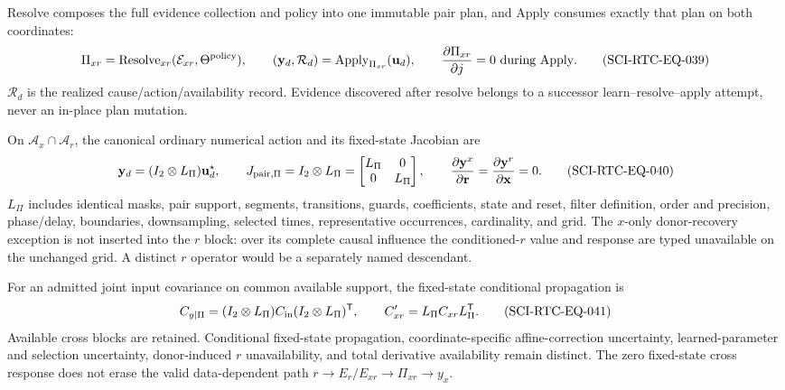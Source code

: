 Resolve composes the full evidence collection and policy into one immutable
pair plan, and Apply consumes exactly that plan on both coordinates:
\begin{equation}
 \Pi_{xr}=\operatorname{Resolve}_{xr}(\mathcal E_{xr},
               \Theta^{\rm policy}),\qquad
 (\mathbf y_d,\mathcal R_d)=\operatorname{Apply}_{\Pi_{xr}}
               (\mathbf u_d),\qquad
 \frac{\partial\Pi_{xr}}{\partial j}=0\ \text{during Apply}.
 \tag{SCI-RTC-EQ-039}\label{eq:pair-resolve-apply}
\end{equation}
$\mathcal R_d$ is the realized cause/action/availability record.  Evidence
discovered after resolve belongs to a successor learn--resolve--apply attempt,
never an in-place plan mutation.

On $\mathcal A_x\cap\mathcal A_r$, the canonical ordinary numerical action
and its fixed-state Jacobian are
\begin{equation}
 \mathbf y_d=(I_2\otimes L_\Pi)\mathbf u_d^\star,
 \qquad
 J_{{\rm pair},\Pi}=I_2\otimes L_\Pi
 =\begin{bmatrix}L_\Pi&0\\0&L_\Pi\end{bmatrix},
 \qquad
 \frac{\partial\mathbf y^x}{\partial\mathbf r}
 =\frac{\partial\mathbf y^r}{\partial\mathbf x}=0.
 \tag{SCI-RTC-EQ-040}\label{eq:canonical-pair-operator}
\end{equation}
$L_\Pi$ includes identical masks, pair support, segments, transitions, guards,
coefficients, state and reset, filter definition, order and precision,
phase/delay, boundaries, downsampling, selected times, representative
occurrences, cardinality, and grid.  The $x$-only donor-recovery exception is
not inserted into the $r$ block: over its complete causal influence the
conditioned-$r$ value and response are typed unavailable on the unchanged
grid.  A distinct $r$ operator would be a separately named descendant.

For an admitted joint input covariance on common available support, the
fixed-state conditional propagation is
\begin{equation}
 C_{y\mid\Pi}=(I_2\otimes L_\Pi)C_{\rm in}
                    (I_2\otimes L_\Pi)^{\mathsf T},
 \qquad
 C'_{xr}=L_\Pi C_{xr}L_\Pi^{\mathsf T}.
 \tag{SCI-RTC-EQ-041}\label{eq:canonical-pair-covariance}
\end{equation}
Available cross blocks are retained.  Conditional fixed-state propagation,
coordinate-specific affine-correction uncertainty, learned-parameter and
selection uncertainty, donor-induced $r$ unavailability, and total derivative
availability remain distinct.  The zero fixed-state cross response does not
erase the valid data-dependent path
$r\rightarrow E_r/E_{xr}\rightarrow\Pi_{xr}\rightarrow y_x$.

